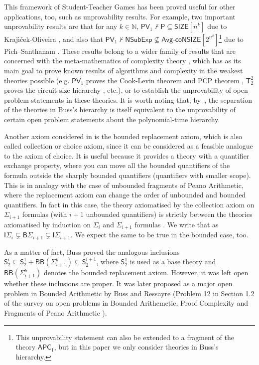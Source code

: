 \documentclass[11pt]{article}
\newcommand{\N}{\mathbb{N}}
\renewcommand{\P}{\mathsf{P}}
\newcommand{\PV}{\mathsf{PV}}
\newcommand{\SOT}{\mathsf{S}^1_2}
\newcommand{\APC}{\mathsf{APC}}
\theoremstyle{definition}
\theoremstyle{definition}
\theoremstyle{remark}
\begin{document}
This framework of Student-Teacher Games has been proved useful for other applications, too, such as unprovability results. For example, two important unprovability results are that for any $k \in \N$, $\PV_1 \nvdash \P \subseteq \mathsf{SIZE}[n^k]$ due to Kraj\'{\i}\v{c}ek-Oliveira \cite{KO17}, and also that $\PV_1\nvdash \mathsf{NSubExp} \not\subseteq \mathsf{Avg}\text{-} \mathsf{coNSIZE}[2^{n^\delta}]$\footnote{This unprovability statement can also be extended to a fragment of the theory $\APC_1$, but in this paper we only consider theories in Buss's hierarchy.} due to Pich–Santhanam \cite{pichS21}. These results belong to a wider family of results that are concerned with the meta-mathematics of complexity theory \cite{oli2025}, which has as its main goal to prove known results of algorithms and complexity in the weakest theories possible (e.g. $\PV_1$ proves the Cook-Levin theorem and PCP theorem \cite{pichpcp}, $\mathsf{T}^2_2$ proves the circuit size hierarchy \cite{ckkot}, etc.), or to establish the unprovability of open problem statements in these theories. It is worth noting that, by~\cite{KrajicekPT91}, the separation of the theories in Buss's hierarchy is itself equivalent to the unprovability of certain open problem statements about the polynomial-time hierarchy.


Another axiom considered in \cite{buss1985bounded} is the bounded replacement axiom, which is also called collection or choice axiom, since it can be considered as a feasible analogue to the axiom of choice. It is useful because it provides a theory with a quantifier exchange property, where you can move all the bounded quantifiers of the formula outside the sharply bounded quantifiers (quantifiers with smaller scope). This is in analogy with the case of unbounded fragments of Peano Arithmetic, where the replacement axiom can change the order of unbounded and bounded quantifiers. In fact in this case, the theory axiomatised by the collection axiom on $\Sigma_{i+1}$ formulas (with $i+1$ unbounded quantifiers) is strictly between the theories axiomatised by induction on $\Sigma_{i}$ and $\Sigma_{i+1}$ formulas \cite{PARIS1978199}. We write that as $\mathsf{I}\Sigma_{i}\subsetneq \mathsf{B}\Sigma_{i+1}\subsetneq \mathsf{I}\Sigma_{i+1}$. We expect the same to be true in the bounded case, too.

As a matter of fact, Buss proved the analogous inclusions $\mathsf{S}^{i}_2\subseteq \SOT +\mathsf{BB}(\Sigma^b_{i+1})\subseteq \mathsf{S}^{i+1}_2$, where $\SOT$ is used as a base theory and $\mathsf{BB}(\Sigma^b_{i+1})$ denotes the bounded replacement axiom. However, it was left open whether these inclusions are proper. It was later proposed as a major open problem in Bounded Arithmetic by Buss and Ressayre (Problem 12 in Section 1.2 of the survey on open problems in Bounded Arithemetic, Proof Complexity and Fragments of Peano Arithmetic \cite{clote1993open}).
\end{document}
